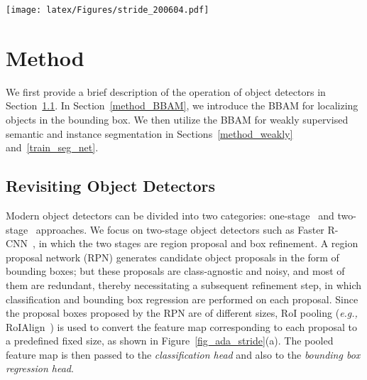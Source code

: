 \documentclass[final]{cvpr}
\begin{document}
\begin{figure*}[t]
  \centering
  \texttt{[image: latex/Figures/stride\_200604.pdf]} \\[-0.5em]
  \caption{\label{fig_ada_stride} The size of the \textit{perturbation unit} needs to be adjusted to the object size. (a) RoIAlign~\cite{he2017mask} produces perturbation units of different sizes. (b) Examples of resulting BBAMs with small fixed values of $s$, large fixed values of $s$, and values of $s$ determined adaptively. Fixed values of $s$, whether large or small, tend to generate unwanted artifacts.}
  \vspace{-0.8em}
\end{figure*} 
\vspace{-0.2em}
\section{Method}
\vspace{-0.2em}
We first provide a brief description of the operation of object detectors in Section~\ref{revisit_FRCNN}. In Section~\ref{method_BBAM}, we introduce the BBAM for localizing objects in the bounding box. We then utilize the BBAM for weakly supervised semantic and instance segmentation in Sections~\ref{method_weakly} and~\ref{train_seg_net}.

\subsection{Revisiting Object Detectors}\label{revisit_FRCNN}
Modern object detectors can be divided into two categories: one-stage~\cite{liu2016ssd, lin2017focal, redmon2016you} and two-stage~\cite{ren2015faster, girshick2015fast} approaches.
We focus on two-stage object detectors such as Faster R-CNN~\cite{ren2015faster}, in which the two stages are region proposal and box refinement. 
A region proposal network (RPN) generates candidate object proposals in the form of bounding boxes; but these proposals are class-agnostic and noisy, and most of them are redundant, thereby necessitating a subsequent refinement step, in which classification and bounding box regression are performed on each proposal.
Since the proposal boxes proposed by the RPN are of different sizes, RoI pooling (\textit{e.g.,} RoIAlign~\cite{he2017mask}) is used to convert the feature map corresponding to each proposal to a predefined fixed size, as shown in Figure~\ref{fig_ada_stride}(a). The pooled feature map is then passed to the \textit{classification head} and also to the \textit{bounding box regression head}.
\end{document}
